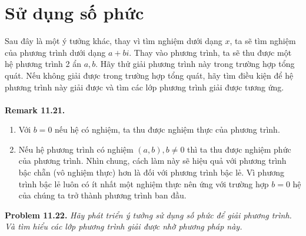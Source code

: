 \documentclass[a4paper,oneside]{book}
\numberwithin{equation}{chapter}
\begin{document}
\section{Sử dụng số phức}
Sau đây là một ý tưởng khác, thay vì tìm nghiệm dưới dạng $x$, ta sẽ tìm nghiệm của phương trình dưới dạng $a + bi$. Thay vào  phương trình, ta sẽ thu được một hệ phương trình 2 ẩn $a,b$. Hãy thử giải phương trình này trong trường hợp tổng quát. Nếu không giải được trong trường hợp tổng quát, hãy tìm điều kiện để hệ phương trình này giải được và tìm các lớp phương trình giải được tương ứng.\\
\\
\textbf{Remark 11.21.} 
\begin{enumerate}
\item Với $b=0$ nếu hệ có nghiệm, ta thu được nghiệm thực của phương trình.
\item Nếu hệ phương trình có nghiệm $\left( {a,b} \right),b \ne 0$ thì ta thu được nghiệm phức của phương trình. Nhìn chung, cách làm này sẽ hiệu quả với phương trình bậc chẵn (vô nghiệm thực) hơn là đối với phương trình bậc lẻ. Vì phương trình bậc lẻ luôn có ít nhất một nghiệm thực nên ứng với trường hợp $b=0$ hệ của chúng ta trở thành phương trình ban đầu.
\end{enumerate}
\textbf{Problem 11.22.} \textit{Hãy phát triển ý tưởng sử dụng số phức để giải phương trình. Và tìm hiểu các lớp phương trình giải được nhờ phương pháp này.}
\end{document}
